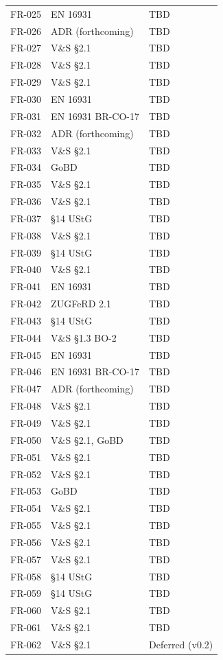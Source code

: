 \documentclass[11pt,a4paper]{article}
\begin{document}
\begin{longtable}{lll}
FR-025 & EN 16931 & TBD \\
FR-026 & ADR (forthcoming) & TBD \\
FR-027 & V\&S \S2.1 & TBD \\
FR-028 & V\&S \S2.1 & TBD \\
FR-029 & V\&S \S2.1 & TBD \\
FR-030 & EN 16931 & TBD \\
FR-031 & EN 16931 BR-CO-17 & TBD \\
FR-032 & ADR (forthcoming) & TBD \\
FR-033 & V\&S \S2.1 & TBD \\
FR-034 & GoBD & TBD \\
FR-035 & V\&S \S2.1 & TBD \\
FR-036 & V\&S \S2.1 & TBD \\
FR-037 & \S14 UStG & TBD \\
FR-038 & V\&S \S2.1 & TBD \\
FR-039 & \S14 UStG & TBD \\
FR-040 & V\&S \S2.1 & TBD \\
FR-041 & EN 16931 & TBD \\
FR-042 & ZUGFeRD 2.1 & TBD \\
FR-043 & \S14 UStG & TBD \\
FR-044 & V\&S \S1.3 BO-2 & TBD \\
FR-045 & EN 16931 & TBD \\
FR-046 & EN 16931 BR-CO-17 & TBD \\
FR-047 & ADR (forthcoming) & TBD \\
FR-048 & V\&S \S2.1 & TBD \\
FR-049 & V\&S \S2.1 & TBD \\
FR-050 & V\&S \S2.1, GoBD & TBD \\
FR-051 & V\&S \S2.1 & TBD \\
FR-052 & V\&S \S2.1 & TBD \\
FR-053 & GoBD & TBD \\
FR-054 & V\&S \S2.1 & TBD \\
FR-055 & V\&S \S2.1 & TBD \\
FR-056 & V\&S \S2.1 & TBD \\
FR-057 & V\&S \S2.1 & TBD \\
FR-058 & \S14 UStG & TBD \\
FR-059 & \S14 UStG & TBD \\
FR-060 & V\&S \S2.1 & TBD \\
FR-061 & V\&S \S2.1 & TBD \\
FR-062 & V\&S \S2.1 & Deferred (v0.2) \\

\end{longtable}
\end{document}
